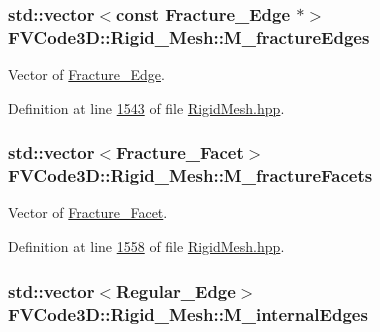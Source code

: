 \subsubsection[{\texorpdfstring{M\+\_\+fracture\+Edges}{M_fractureEdges}}]{\setlength{\rightskip}{0pt plus 5cm}std\+::vector$<$const {\bf Fracture\+\_\+\+Edge} $\ast$$>$ F\+V\+Code3\+D\+::\+Rigid\+\_\+\+Mesh\+::\+M\+\_\+fracture\+Edges\hspace{0.3cm}{\ttfamily [protected]}}\hypertarget{classFVCode3D_1_1Rigid__Mesh_af4626d6b92116a3f6e925847f413da2b}{}\label{classFVCode3D_1_1Rigid__Mesh_af4626d6b92116a3f6e925847f413da2b}


Vector of \hyperlink{classFVCode3D_1_1Rigid__Mesh_1_1Fracture__Edge}{Fracture\+\_\+\+Edge}. 



Definition at line \hyperlink{RigidMesh_8hpp_source_l01543}{1543} of file \hyperlink{RigidMesh_8hpp_source}{Rigid\+Mesh.\+hpp}.

\subsubsection[{\texorpdfstring{M\+\_\+fracture\+Facets}{M_fractureFacets}}]{\setlength{\rightskip}{0pt plus 5cm}std\+::vector$<${\bf Fracture\+\_\+\+Facet}$>$ F\+V\+Code3\+D\+::\+Rigid\+\_\+\+Mesh\+::\+M\+\_\+fracture\+Facets\hspace{0.3cm}{\ttfamily [protected]}}\hypertarget{classFVCode3D_1_1Rigid__Mesh_acaff9da1f03f04f7012cf372f8f27cd6}{}\label{classFVCode3D_1_1Rigid__Mesh_acaff9da1f03f04f7012cf372f8f27cd6}


Vector of \hyperlink{classFVCode3D_1_1Rigid__Mesh_1_1Fracture__Facet}{Fracture\+\_\+\+Facet}. 



Definition at line \hyperlink{RigidMesh_8hpp_source_l01558}{1558} of file \hyperlink{RigidMesh_8hpp_source}{Rigid\+Mesh.\+hpp}.

\subsubsection[{\texorpdfstring{M\+\_\+internal\+Edges}{M_internalEdges}}]{\setlength{\rightskip}{0pt plus 5cm}std\+::vector$<${\bf Regular\+\_\+\+Edge}$>$ F\+V\+Code3\+D\+::\+Rigid\+\_\+\+Mesh\+::\+M\+\_\+internal\+Edges\hspace{0.3cm}{\ttfamily [protected]}}\hypertarget{classFVCode3D_1_1Rigid__Mesh_a3b689233b2590d76d663195b89d380fb}{}\label{classFVCode3D_1_1Rigid__Mesh_a3b689233b2590d76d663195b89d380fb}


